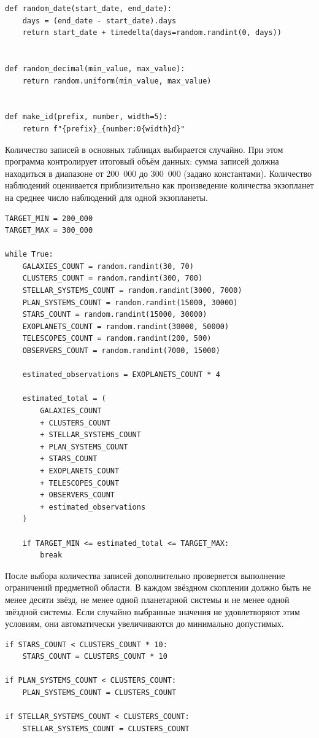 \documentclass[14pt,a4paper]{extarticle}
\begin{document}
\begin{lstlisting}[caption={Вспомогательные функции генерации}]
def random_date(start_date, end_date):
    days = (end_date - start_date).days
    return start_date + timedelta(days=random.randint(0, days))


def random_decimal(min_value, max_value):
    return random.uniform(min_value, max_value)


def make_id(prefix, number, width=5):
    return f"{prefix}_{number:0{width}d}"
\end{lstlisting}

Количество записей в основных таблицах выбирается случайно. При этом программа контролирует итоговый объём данных: сумма записей должна находиться в диапазоне от 200~000 до 300~000 (задано константами). Количество наблюдений оценивается приблизительно как произведение количества экзопланет на среднее число наблюдений для одной экзопланеты.

\begin{lstlisting}[caption={Генерация случайного количества записей}]
TARGET_MIN = 200_000
TARGET_MAX = 300_000

while True:
    GALAXIES_COUNT = random.randint(30, 70)
    CLUSTERS_COUNT = random.randint(300, 700)
    STELLAR_SYSTEMS_COUNT = random.randint(3000, 7000)
    PLAN_SYSTEMS_COUNT = random.randint(15000, 30000)
    STARS_COUNT = random.randint(15000, 30000)
    EXOPLANETS_COUNT = random.randint(30000, 50000)
    TELESCOPES_COUNT = random.randint(200, 500)
    OBSERVERS_COUNT = random.randint(7000, 15000)

    estimated_observations = EXOPLANETS_COUNT * 4

    estimated_total = (
        GALAXIES_COUNT
        + CLUSTERS_COUNT
        + STELLAR_SYSTEMS_COUNT
        + PLAN_SYSTEMS_COUNT
        + STARS_COUNT
        + EXOPLANETS_COUNT
        + TELESCOPES_COUNT
        + OBSERVERS_COUNT
        + estimated_observations
    )

    if TARGET_MIN <= estimated_total <= TARGET_MAX:
        break
\end{lstlisting}

После выбора количества записей дополнительно проверяется выполнение ограничений предметной области. В каждом звёздном скоплении должно быть не менее десяти звёзд, не менее одной планетарной системы и не менее одной звёздной системы. Если случайно выбранные значения не удовлетворяют этим условиям, они автоматически увеличиваются до минимально допустимых.

\begin{lstlisting}[caption={Проверка минимальных требований к иерархии}]
if STARS_COUNT < CLUSTERS_COUNT * 10:
    STARS_COUNT = CLUSTERS_COUNT * 10

if PLAN_SYSTEMS_COUNT < CLUSTERS_COUNT:
    PLAN_SYSTEMS_COUNT = CLUSTERS_COUNT

if STELLAR_SYSTEMS_COUNT < CLUSTERS_COUNT:
    STELLAR_SYSTEMS_COUNT = CLUSTERS_COUNT
\end{lstlisting}
\end{document}
